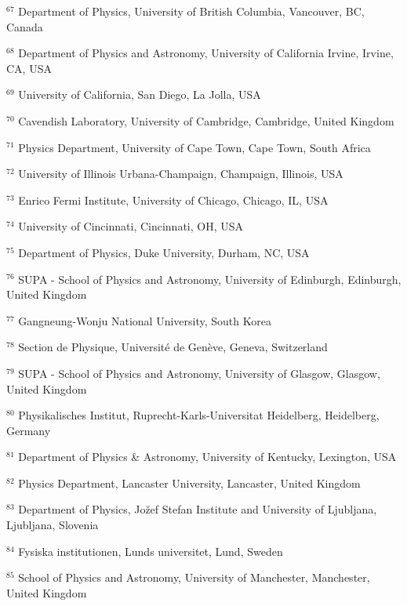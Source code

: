 \par {\footnotesize $^{67}$ Department of Physics, University of British Columbia, Vancouver, BC, Canada}
\par {\footnotesize $^{68}$ Department of Physics and Astronomy, University of California Irvine, Irvine, CA, USA}
\par {\footnotesize $^{69}$ University of California, San Diego, La Jolla, USA}
\par {\footnotesize $^{70}$ Cavendish Laboratory, University of Cambridge, Cambridge, United Kingdom}
\par {\footnotesize $^{71}$ Physics Department, University of Cape Town, Cape Town, South Africa}
\par {\footnotesize $^{72}$ University of Illinois Urbana-Champaign, Champaign, Illinois, USA}
\par {\footnotesize $^{73}$ Enrico Fermi Institute, University of Chicago, Chicago, IL, USA}
\par {\footnotesize $^{74}$ University of Cincinnati, Cincinnati, OH, USA}
\par {\footnotesize $^{75}$ Department of Physics, Duke University, Durham, NC, USA}
\par {\footnotesize $^{76}$ SUPA - School of Physics and Astronomy, University of Edinburgh, Edinburgh, United Kingdom}
\par {\footnotesize $^{77}$ Gangneung-Wonju National University, South Korea}
\par {\footnotesize $^{78}$ Section de Physique, Université de Genève, Geneva, Switzerland}
\par {\footnotesize $^{79}$ SUPA - School of Physics and Astronomy, University of Glasgow, Glasgow, United Kingdom}
\par {\footnotesize $^{80}$ Physikalisches Institut, Ruprecht-Karls-Universitat Heidelberg, Heidelberg, Germany}
\par {\footnotesize $^{81}$ Department of Physics \& Astronomy, University of Kentucky, Lexington, USA}
\par {\footnotesize $^{82}$ Physics Department, Lancaster University, Lancaster, United Kingdom}
\par {\footnotesize $^{83}$ Department of Physics, Jožef Stefan Institute and University of Ljubljana, Ljubljana, Slovenia}
\par {\footnotesize $^{84}$ Fysiska institutionen, Lunds universitet, Lund, Sweden}
\par {\footnotesize $^{85}$ School of Physics and Astronomy, University of Manchester, Manchester, United Kingdom}
